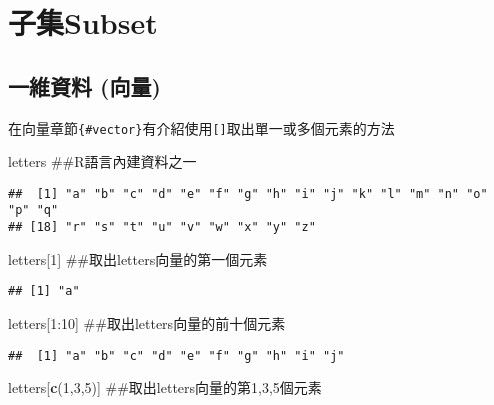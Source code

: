 \documentclass[]{book}
\newenvironment{Shaded}{\begin{snugshade}}{\end{snugshade}}
\newcommand{\KeywordTok}[1]{\textcolor[rgb]{0.13,0.29,0.53}{\textbf{{#1}}}}
\newcommand{\DecValTok}[1]{\textcolor[rgb]{0.00,0.00,0.81}{{#1}}}
\newcommand{\NormalTok}[1]{{#1}}
\begin{document}
\section{子集Subset}\label{subset}

\subsection{一維資料 (向量)}\label{-}

在向量章節\texttt{\{\#vector\}}有介紹使用\texttt{{[}{]}}取出單一或多個元素的方法

\begin{Shaded}
\begin{Highlighting}[]
\NormalTok{letters ##R語言內建資料之一}
\end{Highlighting}
\end{Shaded}

\begin{verbatim}
##  [1] "a" "b" "c" "d" "e" "f" "g" "h" "i" "j" "k" "l" "m" "n" "o" "p" "q"
## [18] "r" "s" "t" "u" "v" "w" "x" "y" "z"
\end{verbatim}

\begin{Shaded}
\begin{Highlighting}[]
\NormalTok{letters[}\DecValTok{1}\NormalTok{] ##取出letters向量的第一個元素}
\end{Highlighting}
\end{Shaded}

\begin{verbatim}
## [1] "a"
\end{verbatim}

\begin{Shaded}
\begin{Highlighting}[]
\NormalTok{letters[}\DecValTok{1}\NormalTok{:}\DecValTok{10}\NormalTok{] ##取出letters向量的前十個元素}
\end{Highlighting}
\end{Shaded}

\begin{verbatim}
##  [1] "a" "b" "c" "d" "e" "f" "g" "h" "i" "j"
\end{verbatim}

\begin{Shaded}
\begin{Highlighting}[]
\NormalTok{letters[}\KeywordTok{c}\NormalTok{(}\DecValTok{1}\NormalTok{,}\DecValTok{3}\NormalTok{,}\DecValTok{5}\NormalTok{)] ##取出letters向量的第1,3,5個元素}
\end{Highlighting}
\end{Shaded}
\end{document}
